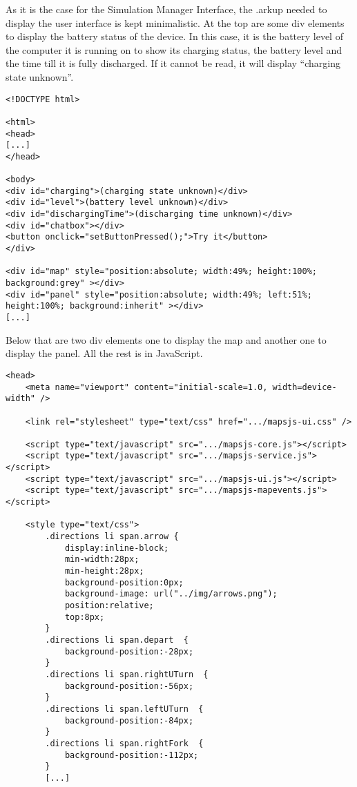 As it is the case for the Simulation Manager Interface, the .arkup needed to display the user interface is kept minimalistic. At the top are some div elements to display the battery status of the device. In this case, it is the battery level of the computer it is running on to show its charging status, the battery level and the time till it is fully discharged. If it cannot be read, it will display ``charging state unknown''.

\begin{verbatim}
<!DOCTYPE html>

<html>
<head>
[...]
</head>

<body>
<div id="charging">(charging state unknown)</div>
<div id="level">(battery level unknown)</div>
<div id="dischargingTime">(discharging time unknown)</div>
<div id="chatbox"></div>
<button onclick="setButtonPressed();">Try it</button>
</div>

<div id="map" style="position:absolute; width:49%; height:100%; background:grey" ></div>
<div id="panel" style="position:absolute; width:49%; left:51%; height:100%; background:inherit" ></div>
[...]
\end{verbatim}

Below that are two div elements one to display the map and another one to display the panel. All the rest is in JavaScript.

\begin{verbatim}
<head>
    <meta name="viewport" content="initial-scale=1.0, width=device-width" />

    <link rel="stylesheet" type="text/css" href=".../mapsjs-ui.css" />

    <script type="text/javascript" src=".../mapsjs-core.js"></script>
    <script type="text/javascript" src=".../mapsjs-service.js"></script>
    <script type="text/javascript" src=".../mapsjs-ui.js"></script>
    <script type="text/javascript" src=".../mapsjs-mapevents.js"></script>

    <style type="text/css">
        .directions li span.arrow {
            display:inline-block;
            min-width:28px;
            min-height:28px;
            background-position:0px;
            background-image: url("../img/arrows.png");
            position:relative;
            top:8px;
        }
        .directions li span.depart  {
            background-position:-28px;
        }
        .directions li span.rightUTurn  {
            background-position:-56px;
        }
        .directions li span.leftUTurn  {
            background-position:-84px;
        }
        .directions li span.rightFork  {
            background-position:-112px;
        }
        [...]
\end{verbatim}

